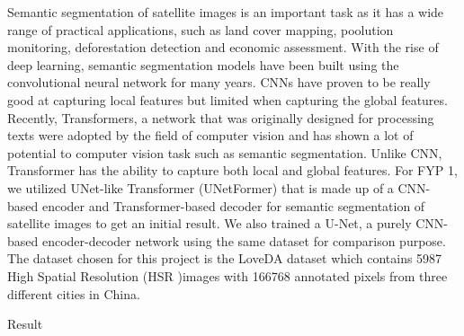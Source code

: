 
Semantic segmentation of satellite images is an important task as it has a wide range of practical applications, such as land cover mapping, poolution monitoring, deforestation detection and economic assessment. With the rise of deep learning, semantic segmentation models have been built using the convolutional neural network for many years. CNNs have proven to be really good at capturing local features but limited when capturing the global features. Recently, Transformers, a network that was originally designed for processing texts were adopted by the field of computer vision and has shown a lot of potential to computer vision task such as semantic segmentation. Unlike CNN, Transformer has the ability to capture both local and global features. For FYP 1, we utilized UNet-like Transformer (UNetFormer) that is made up of a CNN-based encoder and Transformer-based decoder for semantic segmentation of satellite images to get an initial result. We also trained a U-Net, a purely CNN-based encoder-decoder network using the same dataset for comparison purpose. The dataset chosen for this project is the LoveDA dataset which contains 5987 High Spatial Resolution (HSR )images with 166768 annotated pixels from three different cities in China.

Result

